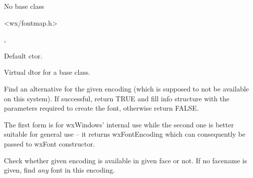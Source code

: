 
No base class


<wx/fontmap.h>


, 



\label{wxfontmapperwxfontmapper}


Default ctor.


\label{wxfontmapperdtor}


Virtual dtor for a base class.


\label{wxfontmappergetaltforencoding}



Find an alternative for the given encoding (which is supposed to not be
available on this system). If successful, return TRUE and fill info
structure with the parameters required to create the font, otherwise
return FALSE.

The first form is for wxWindows' internal use while the second one
is better suitable for general use -- it returns wxFontEncoding which
can consequently be passed to wxFont constructor.


\label{wxfontmapperisencodingavailable}


Check whether given encoding is available in given face or not.
If no facename is given, find {\it any} font in this encoding.


